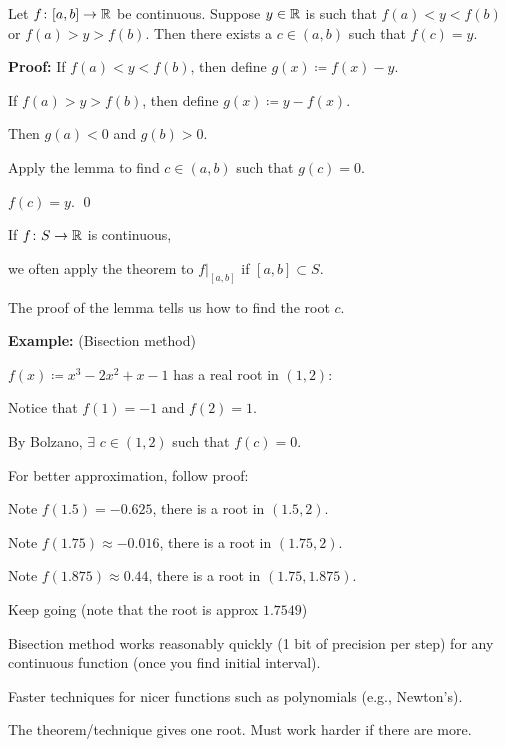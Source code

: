 \documentclass[10pt,aspectratio=169]{beamer}
\begin{document}
\begin{frame}

\begin{theorem}
Let $f \colon [a,b] \to {\mathbb{R}}$ be continuous.
Suppose $y \in {\mathbb{R}}$ is such that $f(a) < y < f(b)$
or $f(a) > y > f(b)$.
\pause
Then there exists a $c \in (a,b)$
such that $f(c) = y$.
\end{theorem}

\pause
\textbf{Proof:}
If $f(a) < y < f(b)$, then define $g(x) \coloneqq f(x)-y$.

\pause

If $f(a) > y > f(b)$, then define $g(x) \coloneqq y-f(x)$.

\pause
\medskip

Then $g(a) < 0$ and $g(b) > 0$.

\pause
Apply the lemma to find $c \in (a,b)$ such that $g(c) = 0$.

\pause
\thus \quad $f(c) = y$.
\qed

\pause
\medskip

If $f \colon S \to {\mathbb{R}}$ is continuous,

we often apply the theorem to $f|_{[a,b]}$ if $[a,b] \subset S$.

\end{frame}

\begin{frame}

The proof of the lemma tells us how to find the root $c$.

\pause
\medskip

\textbf{Example:} (Bisection method)

$f(x) \coloneqq x^3-2x^2+x-1$ has a real root in $(1,2)$:

\pause
Notice that $f(1) = -1$ and $f(2) = 1$.

\pause
By Bolzano, $\exists$ $c \in (1,2)$ such that $f(c) = 0$.

\pause
\medskip

For better approximation, follow proof:

Note $f(1.5) = -0.625$, \wthus
there is a root in $(1.5,2)$.

\pause
Note $f(1.75) \approx -0.016$, \wthus
there is a root in $(1.75,2)$.

\pause
Note $f(1.875) \approx 0.44$, \wthus
there is a root in $(1.75,1.875)$.

\pause
Keep going (note that the root is approx $1.7549$)

\pause
\medskip

Bisection method works reasonably quickly (1 bit of precision per step) for any
continuous function (once you find initial interval).

\pause
\medskip

Faster techniques for nicer functions such as polynomials (e.g., Newton's).

\pause
\medskip

The theorem/technique gives one root.  Must work harder if there are more.

\end{frame}
\end{document}
